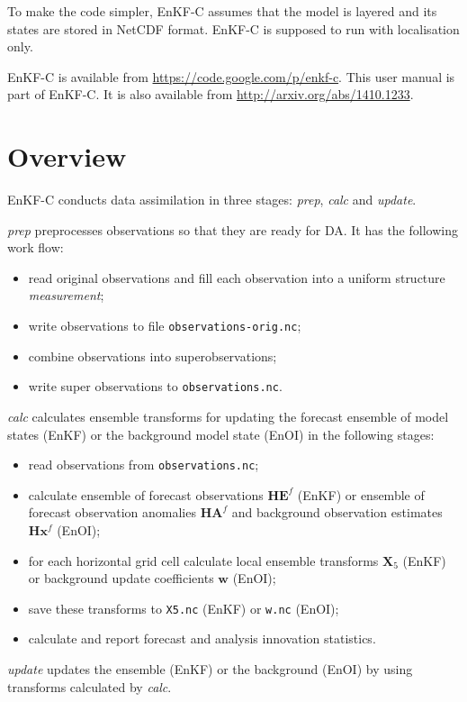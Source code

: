\documentclass[11pt]{report}
\newcommand{\mb} {\mathbf}
\begin{document}
To make the code simpler, EnKF-C assumes that the model is layered and its states are stored in NetCDF format.
EnKF-C is supposed to run with localisation only.

EnKF-C is available from \url{https://code.google.com/p/enkf-c}.
This user manual is part of EnKF-C. 
It is also available from \url{http://arxiv.org/abs/1410.1233}.

\chapter{Overview}

EnKF-C conducts data assimilation in three stages: \emph{prep}, \emph{calc} and \emph{update}.

\emph{prep} preprocesses observations so that they are ready for DA.
It has the following work flow:
\begin{itemize}
\item read original observations and fill each observation into a uniform structure \emph{measurement};
\item write observations to file \verb|observations-orig.nc|;
\item combine observations into superobservations;
\item write super observations to \verb|observations.nc|.
\end{itemize}

\emph{calc} calculates ensemble transforms for updating the forecast ensemble of model states (EnKF) or the background model state (EnOI) in the following stages:
\begin{itemize}
\item read observations from \verb|observations.nc|;
\item calculate ensemble of forecast observations $\mb H \mb E^f$ (EnKF) or ensemble of forecast observation anomalies $\mb H \mb A^f$ and background observation estimates $\mb H \mb x^f$ (EnOI);
\item for each horizontal grid cell calculate local ensemble transforms $\mb X_5$ (EnKF) or background update coefficients $\mb w$ (EnOI);
\item save these transforms to \verb|X5.nc| (EnKF) or \verb|w.nc| (EnOI);
\item calculate and report forecast and analysis innovation statistics.
\end{itemize}

\emph{update} updates the ensemble (EnKF) or the background (EnOI) by using transforms calculated by \emph{calc}.
\end{document}
